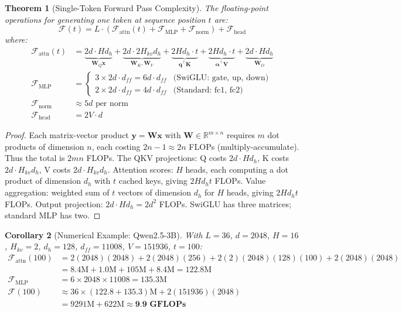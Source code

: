 \documentclass[12pt,a4paper]{article}
\newtheorem{theorem}{Theorem}[section]
\newtheorem{corollary}[theorem]{Corollary}
\begin{document}
\begin{theorem}[Single-Token Forward Pass Complexity]
\label{thm:flops}
The floating-point operations for generating one token at sequence position $t$ are:
\begin{equation}
\boxed{
\mathcal{F}(t) = L \cdot \left(\mathcal{F}_{\text{attn}}(t) + \mathcal{F}_{\text{MLP}} + \mathcal{F}_{\text{norm}}\right) + \mathcal{F}_{\text{head}}
}
\label{eq:total_flops}
\end{equation}
where:
\begin{align}
\mathcal{F}_{\text{attn}}(t) &= \underbrace{2d \cdot H d_h}_{\bm{W}_Q \bm{x}} + \underbrace{2d \cdot 2H_{kv} d_h}_{\bm{W}_K, \bm{W}_V} + \underbrace{2H d_h \cdot t}_{\bm{q}^\top\bm{K}} + \underbrace{2H d_h \cdot t}_{\bm{\alpha}^\top\bm{V}} + \underbrace{2d \cdot H d_h}_{\bm{W}_O} \label{eq:attn_flops} \\
\mathcal{F}_{\text{MLP}} &= \begin{cases}
3 \times 2d \cdot d_{ff} = 6d \cdot d_{ff} & \text{(SwiGLU: gate, up, down)} \\
2 \times 2d \cdot d_{ff} = 4d \cdot d_{ff} & \text{(Standard: fc1, fc2)}
\end{cases} \label{eq:mlp_flops} \\
\mathcal{F}_{\text{norm}} &\approx 5d \text{ per norm} \label{eq:norm_flops} \\
\mathcal{F}_{\text{head}} &= 2V \cdot d \label{eq:head_flops}
\end{align}
\end{theorem}

\begin{proof}
Each matrix-vector product $\bm{y} = \bm{W}\bm{x}$ with $\bm{W} \in \mathbb{R}^{m \times n}$ requires $m$ dot products of dimension $n$, each costing $2n - 1 \approx 2n$ FLOPs (multiply-accumulate). Thus the total is $2mn$ FLOPs. The QKV projections: Q costs $2d \cdot Hd_h$, K costs $2d \cdot H_{kv}d_h$, V costs $2d \cdot H_{kv}d_h$. Attention scores: $H$ heads, each computing a dot product of dimension $d_h$ with $t$ cached keys, giving $2Hd_ht$ FLOPs. Value aggregation: weighted sum of $t$ vectors of dimension $d_h$ for $H$ heads, giving $2Hd_ht$ FLOPs. Output projection: $2d \cdot Hd_h = 2d^2$ FLOPs. SwiGLU has three matrices; standard MLP has two.
\end{proof}

\begin{corollary}[Numerical Example: Qwen2.5-3B]
With $L=36$, $d=2048$, $H=16$, $H_{kv}=2$, $d_h=128$, $d_{ff}=11008$, $V=151936$, $t=100$:
\begin{align}
\mathcal{F}_{\text{attn}}(100) &= 2(2048)(2048) + 2(2048)(256) + 2(2)(2048)(128)(100) + 2(2048)(2048) \nonumber \\
&= 8.4\text{M} + 1.0\text{M} + 105\text{M} + 8.4\text{M} = 122.8\text{M} \\
\mathcal{F}_{\text{MLP}} &= 6 \times 2048 \times 11008 = 135.3\text{M} \\
\mathcal{F}(100) &\approx 36 \times (122.8 + 135.3)\text{M} + 2(151936)(2048) \nonumber \\
&= 9291\text{M} + 622\text{M} \approx \textbf{9.9 GFLOPs}
\end{align}
\end{corollary}
\end{document}
